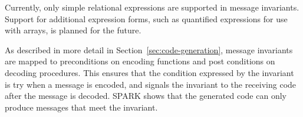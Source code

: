Currently, only simple relational expressions are supported in message invariants. Support for
additional expression forms, such as quantified expressions for use with arrays, is planned for
the future.

As described in more detail in Section~\ref{sec:code-generation}, message invariants are mapped
to preconditions on encoding functions and post conditions on decoding procedures. This ensures
that the condition expressed by the invariant is try when a message is encoded, and signals the
invariant to the receiving code after the message is decoded. SPARK shows that the generated
code can only produce messages that meet the invariant.


